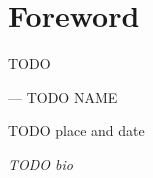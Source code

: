 \section*{Foreword}

TODO
\newline
\begin{flushright}--- TODO NAME\end{flushright}
\begin{flushright}TODO place and date\end{flushright}

\textit{TODO bio}

\newpage
